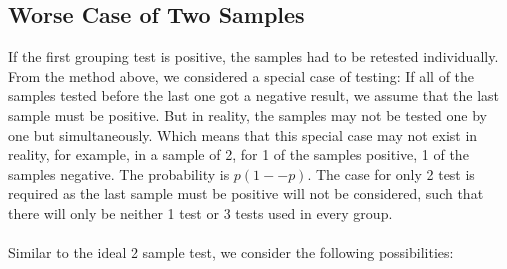 \subsection*{Worse Case of Two Samples}
If the first grouping test is positive, the samples had to be retested individually. From the method above, we considered a special case of testing: If all of the samples tested before the last one got a negative result, we assume that the last sample must be positive. But in reality, the samples may not be tested one by one but simultaneously. Which means that this special case may not exist in reality, for example, in a sample of 2, for 1 of the samples positive, 1 of the samples negative.  The probability is $p(1 -− p)$. The case for only 2 test is required as the last sample must be positive will not be considered, such that there will only be neither 1 test or 3 tests used in every group.
\\
\\
Similar to the ideal 2 sample test, we consider the following possibilities:


